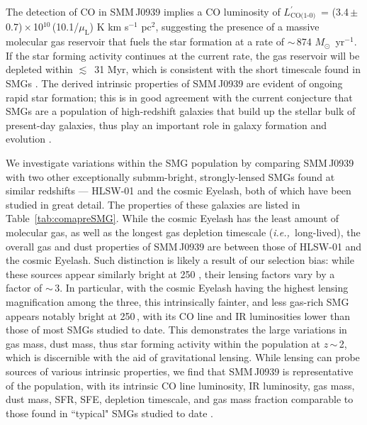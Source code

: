 \documentclass[iop]{emulateapj}
\newcommand{\Msun}{\mbox{$M_{\odot}$}}
\newcommand{\Lp}{\mbox{$L^{\prime}_\textrm{CO(1-0)}$}}
\newcommand{\LpU}{\mbox{K\,\,km\,\,s$^{-1}$\,\,pc$^2$}}
\newcommand{\eg}{{\sl e.g.,~}}
\newcommand{\ie}{{\sl i.e.,~}}
\newcommand{\pmOne}{\mbox{$^{-1}$}}
\begin{document}
The detection of CO in SMM\,J0939
implies a CO luminosity of \Lp\ = (3.4\,$\pm$\,0.7)\,$\times$\,10$^{10}$\,(10.1/$\mu_\textrm{L}$) \LpU, suggesting the presence of a massive
molecular gas reservoir that fuels the star formation at a rate of $\sim$\,874 \Msun~yr\pmOne. If the star forming activity continues at the current rate, the gas reservoir will be depleted within $\lesssim$~31 Myr,
which is consistent with the short timescale found in SMGs \citep{Greve05a}. The derived intrinsic properties of SMM\,J0939 are evident of ongoing rapid star formation; this is in good agreement with the current conjecture that SMGs are a %
population of high-redshift galaxies that build up the stellar bulk of present-day galaxies, thus play an important role
in galaxy formation and evolution \citep[\eg ][]{Dickinson03a}.

We investigate variations within the SMG population by comparing SMM\,J0939 with two other exceptionally submm-bright,
strongly-lensed SMGs
found at similar redshifts --- HLSW-01 and the cosmic Eyelash, both of which have been studied in great detail. The properties
of these galaxies are listed in Table~\ref{tab:comapreSMG}. While the cosmic Eyelash has the least amount of molecular gas, as well as
the
longest gas depletion timescale (\ie long-lived), the overall gas and dust properties of SMM\,J0939 are between those of HLSW-01 and the
cosmic
Eyelash. Such distinction is likely a result of our selection bias: while these sources appear similarly bright at 250 \micron, their lensing factors
vary by a factor of $\sim$\,3. In particular, with the cosmic Eyelash having the highest lensing magnification among the
three, this
intrinsically fainter, and less gas-rich SMG appears notably bright
at 250\,\micron, with its CO line and IR luminosities lower than those of most SMGs studied to date.
This demonstrates
the large variations in gas mass, dust mass, thus star forming activity within the population at $z$\,$\sim$\,2, which is discernible with the aid of gravitational lensing.
While lensing can probe sources
of various intrinsic properties, we find that SMM\,J0939 is representative of the population, with its intrinsic CO line luminosity, IR luminosity, gas mass,
dust mass, SFR, SFE, depletion timescale, and gas mass fraction comparable to those found in ``typical" SMGs studied to date
\citep[\eg ][]{Greve05a,Tacconi10a}.
\end{document}
